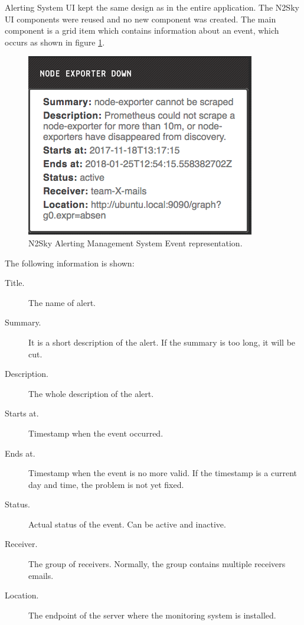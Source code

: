 Alerting System UI kept the same design as in the entire application. The N2Sky UI components were reused and no new component was created. The main component is a grid item which contains information about an event, which occurs as shown in figure \ref{fig:alert_grid}.

\begin{figure}[htbp]
\begin{center}
  \includegraphics[scale=0.7]{components/3/alerts/alert_grid.png}
  \caption{N2Sky Alerting Management System Event representation.}
  \label{fig:alert_grid}
\end{center}
\end{figure}

The following information is shown:

\begin{description}
\item[Title.] The name of alert.
\item[Summary.]  It is a short description of the alert. If the summary is too long, it will be cut.
\item[Description.] The whole description of the alert.
\item[Starts at.] Timestamp when the event occurred. 
\item[Ends at.] Timestamp when the event is no more valid. If the timestamp is a current day and time, the problem is not yet fixed. 
\item[Status.] Actual status of the event. Can be active and inactive.
\item[Receiver.] The group of receivers. Normally, the group contains multiple receivers emails. 
\item[Location.] The endpoint of the server where the monitoring system is installed. 
\end{description}

